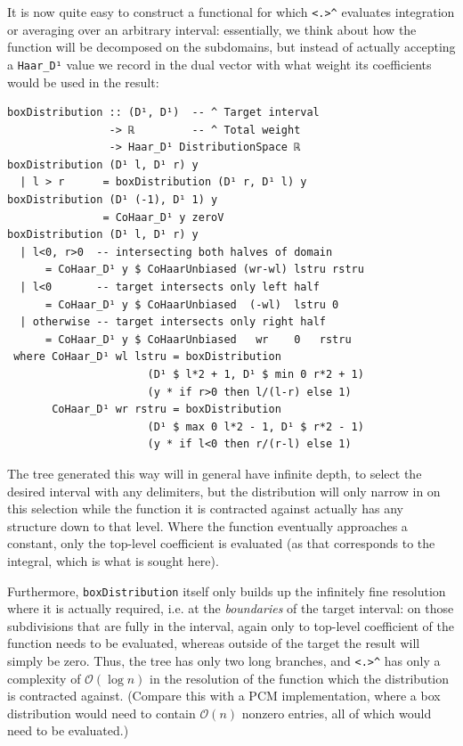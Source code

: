 \documentclass[sigplan,review,anonymous]{acmart}\settopmatter{printfolios=true,printccs=false,printacmref=false}
\theoremstyle{acmplain}
\theoremstyle{acmdefinition}
\begin{document}
It is now quite easy to construct a functional for which \lstinline`<.>^` evaluates integration or averaging over an arbitrary interval: essentially, we think about how the function will be decomposed on the subdomains, but instead of actually accepting a \lstinline`Haar_D¹` value we record in the dual vector with what weight its coefficients would be used in the result:
\begin{lstlisting}
boxDistribution :: (D¹, D¹)  -- ^ Target interval
                -> ℝ         -- ^ Total weight
                -> Haar_D¹ DistributionSpace ℝ
boxDistribution (D¹ l, D¹ r) y
  | l > r      = boxDistribution (D¹ r, D¹ l) y
boxDistribution (D¹ (-1), D¹ 1) y
               = CoHaar_D¹ y zeroV
boxDistribution (D¹ l, D¹ r) y
  | l<0, r>0  -- intersecting both halves of domain
      = CoHaar_D¹ y $ CoHaarUnbiased (wr-wl) lstru rstru
  | l<0       -- target intersects only left half
      = CoHaar_D¹ y $ CoHaarUnbiased  (-wl)  lstru 0
  | otherwise -- target intersects only right half
      = CoHaar_D¹ y $ CoHaarUnbiased   wr    0   rstru
 where CoHaar_D¹ wl lstru = boxDistribution
                      (D¹ $ l*2 + 1, D¹ $ min 0 r*2 + 1)
                      (y * if r>0 then l/(l-r) else 1)
       CoHaar_D¹ wr rstru = boxDistribution
                      (D¹ $ max 0 l*2 - 1, D¹ $ r*2 - 1)
                      (y * if l<0 then r/(r-l) else 1)
\end{lstlisting}
The tree generated this way will in general have infinite depth, to select the desired interval with any delimiters, but the distribution will only narrow in on this selection while the function it is contracted against actually has any structure down to that level. Where the function eventually approaches a constant, only the top-level coefficient is evaluated (as that corresponds to the integral, which is what is sought here).

Furthermore, \lstinline`boxDistribution` itself only builds up the infinitely fine resolution where it is actually required, i.e. at the \emph{boundaries} of the target interval: on those subdivisions that are fully in the interval, again only to top-level coefficient of the function needs to be evaluated, whereas outside of the target the result will simply be zero.
Thus, the tree has only two long branches, and \lstinline`<.>^` has only a complexity of $\mathcal{O}(\log n)$ in the resolution of the function which the distribution is contracted against. (Compare this with a PCM implementation, where a box distribution would need to contain $\mathcal{O}(n)$ nonzero entries, all of which would need to be evaluated.)
\end{document}
